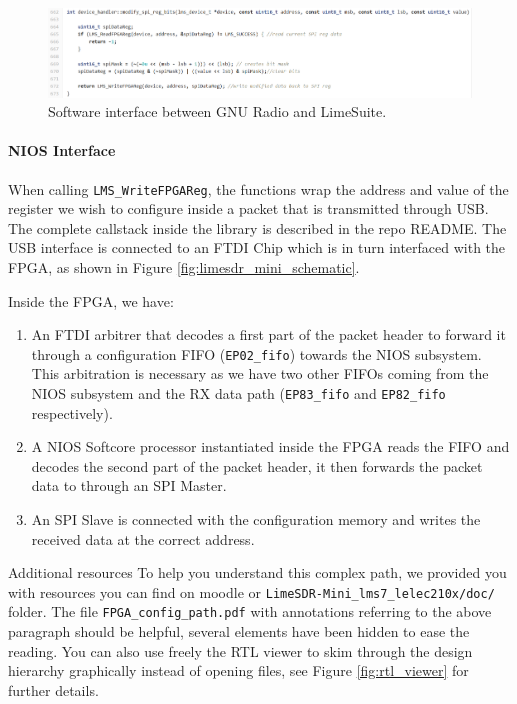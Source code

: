 \begin{figure}[!h]
    \centering
    \includegraphics[width=\linewidth]{figures/grlimesdr_write_fpgacfg.PNG}
    \caption{Software interface between GNU Radio and LimeSuite.}
    \label{fig:modify_spi_reg_bits}
\end{figure}

\paragraph{NIOS Interface}
When calling \texttt{LMS\_WriteFPGAReg}, the functions wrap the address and value of the register we wish to configure inside a packet that is transmitted through USB. The complete callstack inside the library is described in the repo README. The USB interface is connected to an FTDI Chip which is in turn interfaced with the FPGA, as shown in Figure \ref{fig:limesdr_mini_schematic}.

Inside the FPGA, we have:
\begin{enumerate}
    \item An FTDI arbitrer that decodes a first part of the packet header to forward it through a configuration FIFO (\texttt{EP02\_fifo}) towards the NIOS subsystem. This arbitration is necessary as we have two other FIFOs coming from the NIOS subsystem and the RX data path (\texttt{EP83\_fifo} and \texttt{EP82\_fifo} respectively).
    \item A NIOS Softcore processor instantiated inside the FPGA reads the FIFO and decodes the second part of the packet header, it then forwards the packet data to through an SPI Master.
    \item An SPI Slave is connected with the configuration memory and writes the received data at the correct address.
\end{enumerate}

\begin{bclogo}[couleur = gray!20, arrondi = 0.2, logo=\bcinfo]{Additional resources}
To help you understand this complex path, we provided you with resources you can find on moodle or \texttt{LimeSDR-Mini\_lms7\_lelec210x/doc/} folder. The file \texttt{FPGA\_config\_path.pdf} with annotations referring to the above paragraph should be helpful, several elements have been hidden to ease the reading. You can also use freely the RTL viewer to skim through the design hierarchy graphically instead of opening files, see Figure \ref{fig:rtl_viewer} for further details.
\end{bclogo}

